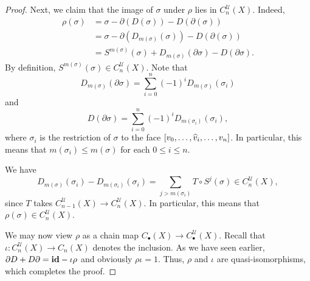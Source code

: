 \begin{proof}
Next, we claim that the image of $\sigma$ under $\rho$ lies in $C_n^{\mathscr U}(X)$. Indeed, 
\begin{align*}
    \rho(\sigma) &= \sigma - \partial(D(\sigma)) - D(\partial(\sigma))\\
    &= \sigma - \partial(D_{m(\sigma)}(\sigma)) - D(\partial(\sigma))\\
    &= S^{m(\sigma)}(\sigma) + D_{m(\sigma)}(\partial\sigma) - D(\partial\sigma).
\end{align*}
By definition, $S^{m(\sigma)}(\sigma)\in C_n^{\mathscr U}(X)$. Note that 
\begin{equation*}
    D_{m(\sigma)}(\partial\sigma) = \sum_{i = 0}^n (-1)^i D_{m(\sigma)}(\sigma_i)
\end{equation*}
and 
\begin{equation*}
    D(\partial\sigma) = \sum_{i = 0}^n (-1)^i D_{m(\sigma_i)}(\sigma_i),
\end{equation*}
where $\sigma_i$ is the restriction of $\sigma$ to the face $[v_0,\dots,\widehat{v}_i,\dots,v_n]$. In particular, this means that $m(\sigma_i)\le m(\sigma)$ for each $0\le i\le n$.

We have 
\begin{equation*}
    D_{m(\sigma)}(\sigma_i) - D_{m(\sigma_i)}(\sigma_i) = \sum_{j > m(\sigma_i)} T\circ S^{j}(\sigma)\in C_n^{\mathscr U}(X),
\end{equation*}
since $T$ takes $C_{n - 1}^{\mathscr U}(X)\to C_{n}^{\mathscr U}(X)$. In particular, this means that $\rho(\sigma)\in C_n^{\mathscr U}(X)$.

We may now view $\rho$ as a chain map $C_\bullet(X)\to C_{\bullet}^{\mathscr U}(X)$. Recall that $\iota: C_n^{\mathscr U}(X)\to C_n(X)$ denotes the inclusion. As we have seen earlier, $\partial D + D\partial = \mathbf{id} - \iota\rho$ and obviously $\rho\iota = 1$. Thus, $\rho$ and $\iota$ are quasi-isomorphisms, which completes the proof.
\end{proof}

